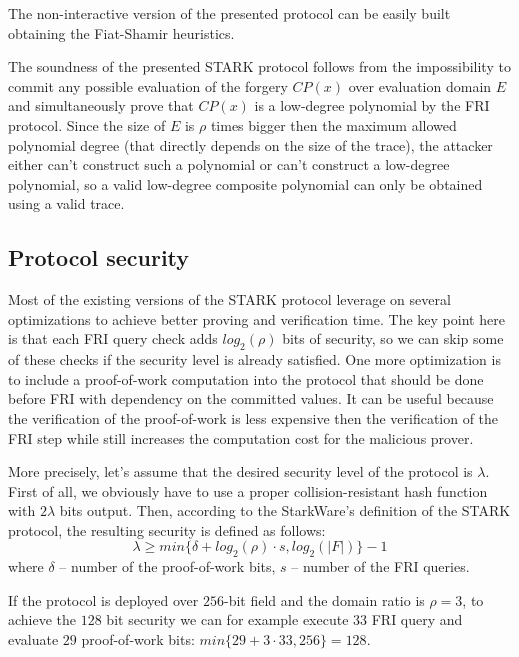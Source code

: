 \documentclass[../lecture-notes.tex]{subfiles}
\begin{document}
The non-interactive version of the presented protocol can be easily built obtaining the Fiat-Shamir heuristics.

The soundness of the presented STARK protocol follows from the impossibility to commit any possible evaluation of the forgery $CP(x)$ over evaluation domain $E$ and simultaneously prove that $CP(x)$ is a low-degree polynomial by the FRI protocol. Since the size of $E$ is $\rho$ times bigger then the maximum allowed polynomial degree (that directly depends on the size of the trace), the attacker either can't construct such a polynomial or can't construct a low-degree polynomial, so a valid low-degree composite polynomial can only be obtained using a valid trace.

\subsection{Protocol security}
Most of the existing versions of the STARK protocol leverage on several optimizations to achieve better proving and verification time. The key point here is that each FRI query check adds $log_2(\rho)$ bits of security, so we can skip some of these checks if the security level is already satisfied. 
One more optimization is to include a proof-of-work computation into the protocol that should be done before FRI with dependency on the committed values.
It can be useful because the verification of the proof-of-work is less expensive then the verification of the FRI step while still increases the computation cost for the malicious prover. 

More precisely, let's assume that the desired security level of the protocol is $\lambda$. First of all, we obviously have to use a proper collision-resistant hash function with $2\lambda$ bits output.
Then, according to the StarkWare's definition of the STARK protocol, the resulting security is defined as follows:
\begin{equation*}
    \lambda \geq min\{ \delta + log_2(\rho) \cdot s, log_2(|F|) \} - 1
\end{equation*}
where $\delta$ -- number of the proof-of-work bits, $s$ -- number of the FRI queries.

\begin{example}
If the protocol is deployed over $256$-bit field and the domain ratio is $\rho = 3$, to achieve the $128$ bit security we can for example execute $33$ FRI query and evaluate $29$ proof-of-work bits: $min\{29+3\cdot 33, 256\} = 128$. 
\end{example}
\end{document}
